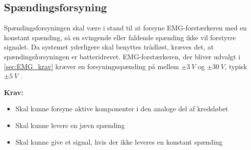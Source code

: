 \subsection{Spændingsforsyning} \label{sec:krav_spaending}
Spændingsforsyningen skal være i stand til at forsyne EMG-forstærkeren med en konstant spænding, så en svingende eller faldende spænding ikke vil forstyrre signalet. Da systemet yderligere skal benyttes trådløst, kræves det, at spændingsforsyningen er batteridrevet. EMG-forstærkeren, der bliver udvalgt i \autoref{sec:EMG_krav} kræver en forsyningsspænding på mellem $\pm 3~V$ og $\pm 30~V$, typisk $\pm 5~V$ \citep{advancertech2013}.


\vspace{3mm}
\textbf{Krav:}
\begin{itemize} 
\item Skal kunne forsyne aktive komponenter i den analoge del af kredsløbet
\item Skal kunne levere en jævn spænding
\item Skal kunne give et signal, hvis der ikke leveres en konstant spænding
\end{itemize}
